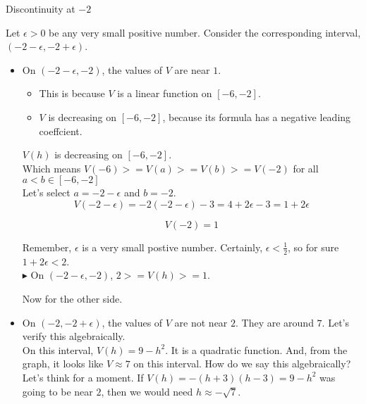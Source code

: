 \documentclass{ximera}
\begin{document}
\begin{explanation} Discontinuity at $-2$


Let $\epsilon > 0$ be any very small positive number.  Consider the corresponding interval, $(-2 - \epsilon, -2 + \epsilon)$.

\begin{itemize}
\item On $(-2 - \epsilon, -2)$, the values of $V$ are near $1$. \\

\begin{itemize}
  \item This is because $V$ is a linear function on $[-6, -2]$.
  \item $V$ is decreasing on $[-6, -2]$, because its formula has a negative leading coeffcient.
\end{itemize}

$V(h)$ is decreasing on $[-6, -2]$. \\
Which means $V(-6) >= V(a) >= V(b) >= V(-2)$ for all $a < b \in [-6, -2]$ \\

Let's select $a = -2 - \epsilon$ and $b = -2$. \\

\[
V(-2 - \epsilon) = -2 (-2 - \epsilon) - 3 = 4 + 2 \epsilon - 3 = 1 + 2 \epsilon 
\]

\[
V(-2) = 1
\]


Remember, $\epsilon$ is a very small postive number.  Certainly, $\epsilon < \frac{1}{2}$, so for sure $1 + 2 \epsilon < 2$. \\


\textbf{\textcolor{blue!55!black}{$\blacktriangleright$}} On $(-2 - \epsilon, -2)$, $2 >= V(h) >= 1$.

Now for the other side. \\



\item On $(-2, -2 + \epsilon)$, the values of $V$ are not near $2$.  They are around $7$. Let's verify this algebraically. \\



On this interval, $V(h) = 9 - h^2$. It is a quadratic function.  And, from the graph, it looks like $V \approx 7$ on this interval. How do we say this algebraically?  \\


Let's think for a moment.  If $V(h) = -(h + 3)(h - 3) = 9 - h^2$ was going to be near $2$, then we would need $h \approx -\sqrt{7}$.  \\


\end{itemize}
\end{explanation}
\end{document}
